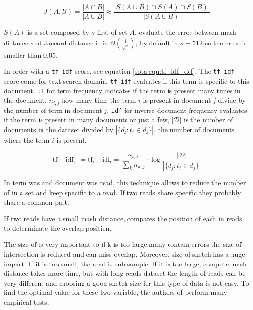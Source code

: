 \documentclass[main]{subfiles}
\begin{document}
\begin{equation}
J(A,B) = \frac{|A \cap B|}{|A \cup B|} \approx \frac{|S(A \cup B) \cap S(A) \cap S(B)|}{|S(A \cup B)|}
\label{sota:equ:mash_dist_def}
\end{equation}

$S(A)$ is a \kmers set composed by $s$ first \kmers of set $A$. \citeauthor{mash_distance} evaluate the error between mash distance and Jaccard distance is in $\mathcal{O}(\frac{1}{\sqrt{s}})$, by default in \mhap $s=512$ so the error is smaller than 0.05.

In \mhap order \kmer with a \texttt{tf-idf} score, see equation \ref{sota:equ:tf_idf_def}. The \texttt{tf-idf} score come for text search domain. \texttt{tf-idf} evaluates if this term is specific to this document. \texttt{tf} for term frequency indicates if the term is present many times in the document, $n_{i,j}$ how many time the term $i$ is present in document $j$ divide by the number of term in document $j$. \texttt{idf} for inverse document frequency evaluates if the term is present in many documents or just a few, $|\mathcal{D}|$ is the number of documents in the dataset divided by $|\{d_{j}:t_{i}\in d_{j}\}|$, the number of documents where the term $i$ is present.

\begin{equation}
\mathrm{tf-idf_{i,j}} = \mathrm{tf_{i,j}} \cdot \mathrm{idf_{i}} = \frac{n_{i,j}}{\sum_{k}n_{k,j}} \cdot \log{\frac  {|\mathcal{D}|}{|\{d_{j}:t_{i}\in d_{j}\}|}}
\label{sota:equ:tf_idf_def}
\end{equation}

In \mhap term was \kmer and document was read, this technique allows to reduce the number of \kmer in a set and keep \kmer specific to a read. If two reads share specific \kmer they probably share a common part.

If two reads have a small mash distance, \mhap compares the position of each \kmer in reads to determinate the overlap position.

The size of \kmer is very important to if k is too large many \kmer contain errors the size of intersection is reduced and \mhap can miss overlap. Moreover, size of sketch has a huge impact. If it is too small, the read is sub-sample. If it is too large, compute mash distance takes more time, but with long-reads dataset the length of reads can be very different and choosing a good sketch size for this type of data is not easy. To find the optimal value for these two variable, the authors of \mhap perform many empirical tests.
\end{document}
